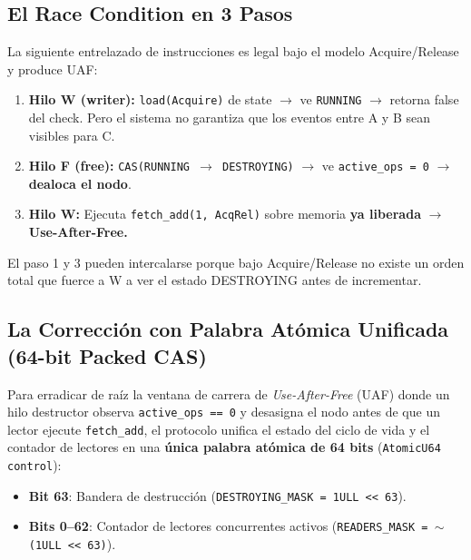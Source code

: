 \subsection{El Race Condition en 3 Pasos}

La siguiente entrelazado de instrucciones es legal bajo el modelo Acquire/Release
y produce UAF:

\begin{enumerate}
\item \textbf{Hilo W (writer):} \texttt{load(Acquire)} de state $\to$ ve \texttt{RUNNING} $\to$ retorna false del check.
   Pero el sistema no garantiza que los eventos entre A y B sean visibles para C.

\item \textbf{Hilo F (free):} \texttt{CAS(RUNNING $\to$ DESTROYING)} $\to$ ve \texttt{active\_ops = 0} $\to$
   \textbf{dealoca el nodo}.

\item \textbf{Hilo W:} Ejecuta \texttt{fetch\_add(1, AcqRel)} sobre memoria \textbf{ya liberada} $\to$
   \textbf{Use-After-Free.}
\end{enumerate}

El paso 1 y 3 pueden intercalarse porque bajo Acquire/Release no existe un
orden total que fuerce a W a ver el estado DESTROYING antes de incrementar.

\subsection{La Corrección con Palabra Atómica Unificada (64-bit Packed CAS)}

Para erradicar de raíz la ventana de carrera de \textit{Use-After-Free} (UAF) donde un hilo destructor
observa \texttt{active\_ops == 0} y desasigna el nodo antes de que un lector ejecute \texttt{fetch\_add},
el protocolo unifica el estado del ciclo de vida y el contador de lectores en una \textbf{única palabra atómica de 64 bits}
(\texttt{AtomicU64 control}):
\begin{itemize}
\item \textbf{Bit 63}: Bandera de destrucción (\texttt{DESTROYING\_MASK = 1ULL << 63}).
\item \textbf{Bits 0--62}: Contador de lectores concurrentes activos (\texttt{READERS\_MASK = $\sim$(1ULL << 63)}).
\end{itemize}

